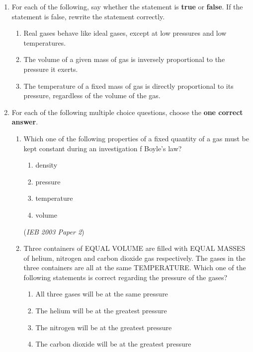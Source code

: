 \begin{eocexercises}{}
\begin{enumerate}
\item{For each of the following, say whether the statement is \textbf{true} or \textbf{false}. If the statement is false, rewrite the statement correctly.}
	\begin{enumerate}
	\item{Real gases behave like ideal gases, except at low pressures and low temperatures.}
	\item{The volume of a given mass of gas is inversely proportional to the pressure it exerts.}
	\item{The temperature of a fixed mass of gas is directly proportional to its pressure, regardless of the volume of the gas.} 
	\end{enumerate}

\item{For each of the following multiple choice questions, choose the \textbf{one correct answer}.}

	\begin{enumerate}
\item{Which one of the following properties of a fixed quantity of a gas must be kept constant during an investigation f Boyle's law?

	\begin{enumerate}
	\item{density}
	\item{pressure}
	\item{temperature}
	\item{volume}
	\end{enumerate}

(\textit{IEB 2003 Paper 2})
}

\item{Three containers of EQUAL VOLUME are filled with EQUAL MASSES of helium, nitrogen and carbon dioxide gas respectively. The gases in the three containers are all at the same TEMPERATURE. Which one of the following statements is correct regarding the pressure of the gases?

	\begin{enumerate}	
	\item{All three gases will be at the same pressure}
	\item{The helium will be at the greatest pressure}
	\item{The nitrogen will be at the greatest pressure}
	\item{The carbon dioxide will be at the greatest pressure}
	\end{enumerate}

}
\end{enumerate}
\end{enumerate}
\end{eocexercises}
